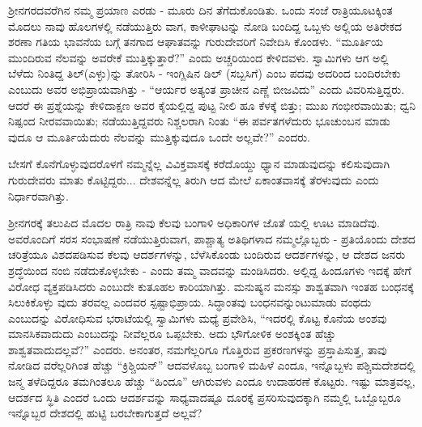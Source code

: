 ಶ‍್ರೀನಗರದವರೆಗಿನ ನಮ್ಮ ಪ್ರಯಾಣ ಎರಡು - ಮೂರು ದಿನ ತೆಗೆದುಕೊಂಡಿತು. ಒಂದು ಸಂಜೆ ರಾತ್ರಿಯೂಟಕ್ಕಿಂತ ಮೊದಲು ನಾವು ಹೊಲಗಳಲ್ಲಿ ನಡೆಯುತ್ತಿರು ವಾಗ, ಕಾಳೀಘಾಟನ್ನು ನೋಡಿ ಬಂದಿದ್ದ ಒಬ್ಬಳು ಅಲ್ಲಿಯ ಅತಿರೇಕದ ಶರಣಾ ಗತಿಯ ಭಾವನೆಯ ಬಗ್ಗೆ ತನಗಾದ ಆಘಾತವನ್ನು ಗುರುದೇವರಿಗೆ ನಿವೇದಿಸಿ ಕೊಂಡಳು. “ಮೂರ್ತಿಯ ಮುಂದಿರುವ ನೆಲವನ್ನು ಅವರೇಕೆ ಮುತ್ತಿಕ್ಕುತ್ತಾರೆ?” ಎಂದು ಅಚ್ಚರಿಯಿಂದ ಕೇಳಿದವಳು. ಸ್ವಾಮಿಗಳು ಆಗ ಅಲ್ಲಿ ಬೆಳೆದು ನಿಂತಿದ್ದ ತಿಲ್(ಎಳ್ಳು)ನ್ನು ತೋರಿಸಿ - ಇಂಗ್ಲಿಷಿನ ಡಿಲ್ (ಸಬ್ಬಸಿಗೆ) ಎಂಬ ಪದವು ಅದರಿಂದ ಬಂದಿರಬೇಕು ಎಂಬುದು ಅವರ ಅಭಿಪ್ರಾಯವಾಗಿತ್ತು - “ಆರ್ಯರ ಅತ್ಯಂತ ಪ್ರಾಚೀನ ಎಣ್ಣೆ ಬೀಜವಿದು” ಎಂದು ವಿವರಿಸುತ್ತಿದ್ದರು. ಆದರೆ ಈ ಪ್ರಶ್ನೆಯನ್ನು ಕೇಳಿದಾಕ್ಷಣ ಅವರ ಕೈಯಲ್ಲಿದ್ದ ಪುಟ್ಟ ನೀಲಿ ಹೂ ಕೆಳಕ್ಕೆ ಬಿತ್ತು; ಮುಖ ಗಂಭೀರವಾಯಿತು; ಧ್ವನಿ ನಿಷ್ಪಂದ ನೀರವವಾಯಿತು; ನಡೆಯುತ್ತಿದ್ದವರು ನಿಶ್ಚಲರಾಗಿ ನಿಂತು “ಈ ಪರ್ವತಗಳೆದುರು ಭೂಚುಂಬನ ಮಾಡು ವುದೂ ಆ ಮೂರ್ತಿಯೆದುರು ನೆಲವನ್ನು ಮುತ್ತಿಕ್ಕುವುದೂ ಒಂದೇ ಅಲ್ಲವೇ?” ಎಂದರು.

ಬೇಸಗೆ ಕೊನೆಗೊಳ್ಳುವುದರೊಳಗೆ ನಮ್ಮನ್ನೆಲ್ಲ ವಿವಿಕ್ತವಾಸಕ್ಕೆ ಕರೆದೊಯ್ದು ಧ್ಯಾನ ಮಾಡುವುದನ್ನು ಕಲಿಸುವುದಾಗಿ ಗುರುದೇವರು ಮಾತು ಕೊಟ್ಟಿದ್ದರು... ದೇಶವನ್ನೆಲ್ಲ ತಿರುಗಿ ಆದ ಮೇಲೆ ಏಕಾಂತವಾಸಕ್ಕೆ ತೆರಳುವುದು ಎಂದು ನಿರ್ಧಾರವಾಗಿತ್ತು.

ಶ‍್ರೀನಗರಕ್ಕೆ ತಲುಪಿದ ಮೊದಲ ರಾತ್ರಿ ನಾವು ಕೆಲವು ಬಂಗಾಳಿ ಅಧಿಕಾರಿಗಳ ಜೊತೆ ಯಲ್ಲಿ ಊಟ ಮಾಡಿದೆವು. ಅವರೊಂದಿಗೆ ಸರಸ ಸಂಭಾಷಣೆ ನಡೆಯುತ್ತಿರುವಾಗ, ಪಾಶ್ಚಾತ್ಯ ಅತಿಥಿಗಳಾದ ನಮ್ಮಲ್ಲೊಬ್ಬರು - ಪ್ರತಿಯೊಂದು ದೇಶದ ಚರಿತ್ರೆಯೂ ವಿಶದಪಡಿಸುವ ಕೆಲವು ಆದರ್ಶಗಳನ್ನು, ಬೆಳೆಸಿಕೊಂಡು ಬಂದಿರುವ ಆದರ್ಶಗಳನ್ನು, ಆ ದೇಶದ ಜನರು ಶ್ರದ್ಧೆಯಿಂದ ನಂಬಿ ನಡೆದುಕೊಳ್ಳಬೇಕು - ಎಂದು ತಮ್ಮ ವಾದವನ್ನು ಮಂಡಿಸಿದರು. ಅಲ್ಲಿದ್ದ ಹಿಂದೂಗಳು ಇದಕ್ಕೆ ಹೇಗೆ ವಿರೋಧ ವ್ಯಕ್ತಪಡಿಸಿದರು ಎಂಬುದೇ ಕುತೂಹಲ ಕಾರಿಯಾಗಿತ್ತು. ಮನುಷ್ಯನ ಮನಸ್ಸು ಶಾಶ್ವತವಾಗಿ ಇಂತಹ ಬಂಧನಕ್ಕೆ ಸಿಲುಕಿಕೊಳ್ಳು ವುದು ತರವಲ್ಲ ಎಂದವರ ಸ್ಪಷ್ಟಾಭಿಪ್ರಾಯ. ಸಿದ್ಧಾಂತವು ಬಂಧನವನ್ನುಂಟುಮಾಡು ವಂಥದು ಎಂಬುದನ್ನು ವಿರೋಧಿಸುವ ಭರಾಟೆಯಲ್ಲಿ ಸ್ವಾಮಿಗಳು ಮಧ್ಯೆ ಪ್ರವೇಶಿಸಿ, “ಇದರಲ್ಲಿ ಕೊಟ್ಟ ಕೊನೆಯ ಅಂಶವು ಮಾನಸಿಕವಾದುದು ಎಂಬುದನ್ನು ನೀವೆಲ್ಲರೂ ಒಪ್ಪಬೇಕು. ಅದು ಭೌಗೋಳಿಕ ಅಂಶಕ್ಕಿಂತ ಹೆಚ್ಚು ಶಾಶ್ವತವಾದುದಲ್ಲವೆ?” ಎಂದರು. ಅನಂತರ, ನಮಗೆಲ್ಲರಿಗೂ ಗೊತ್ತಿರುವ ಪ್ರಕರಣಗಳನ್ನು ಪ್ರಸ್ತಾಪಿಸುತ್ತ, ತಾವು ನೋಡಿದ ವರೆಲ್ಲರಿಗಿಂತ ಹೆಚ್ಚು “ಕ್ರಿಶ್ಚಿಯನ್” ಆದವಳೊಬ್ಬ ಬಂಗಾಳಿ ಮಹಿಳೆ ಎಂದೂ, ಇನ್ನೊಬ್ಬಳು ಪಶ್ಚಿಮದೇಶದಲ್ಲಿ ಜನ್ಮ ತಳೆದಿದ್ದರೂ ತಮಗಿಂತಲೂ ಹೆಚ್ಚು “ಹಿಂದೂ” ಆಗಿರುವಳು ಎಂದೂ ಉದಾಹರಣೆ ಕೊಟ್ಟರು. ಇಷ್ಟು ಮಾತ್ರವಲ್ಲ, ಆದರ್ಶದ ಸ್ಥಿತಿ ಎಂದರೆ ಒಂದು ಆದರ್ಶವನ್ನು ಸಾಧ್ಯವಾದಷ್ಟೂ ದೂರಕ್ಕೆ ಪ್ರಸರಿಸುವುದಕ್ಕಾಗಿ ನಮ್ಮಲ್ಲಿ ಒಬ್ಬೊಬ್ಬರೂ ಇನ್ನೊಬ್ಬರ ದೇಶದಲ್ಲಿ ಹುಟ್ಟಿ ಬರಬೇಕಾಗುತ್ತದೆ ಅಲ್ಲವೆ?

